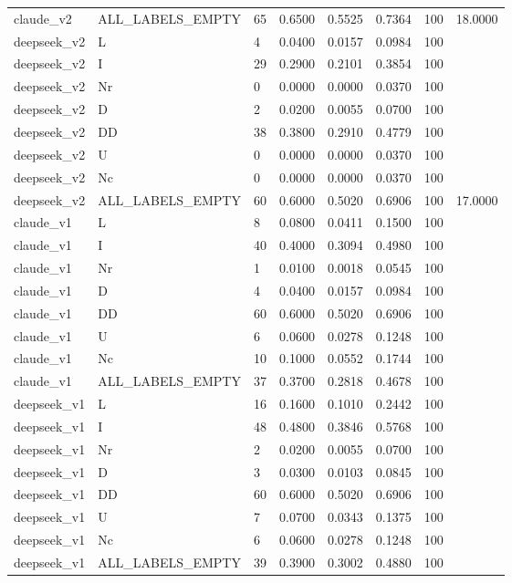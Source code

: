 \begin{table}[ht]
\begin{tabular}{llllllll}
claude\_v2 & ALL\_LABELS\_EMPTY & 65 & 0.6500 & 0.5525 & 0.7364 & 100 & 18.0000 \\
deepseek\_v2 & L & 4 & 0.0400 & 0.0157 & 0.0984 & 100 &  \\
deepseek\_v2 & I & 29 & 0.2900 & 0.2101 & 0.3854 & 100 &  \\
deepseek\_v2 & Nr & 0 & 0.0000 & 0.0000 & 0.0370 & 100 &  \\
deepseek\_v2 & D & 2 & 0.0200 & 0.0055 & 0.0700 & 100 &  \\
deepseek\_v2 & DD & 38 & 0.3800 & 0.2910 & 0.4779 & 100 &  \\
deepseek\_v2 & U & 0 & 0.0000 & 0.0000 & 0.0370 & 100 &  \\
deepseek\_v2 & Nc & 0 & 0.0000 & 0.0000 & 0.0370 & 100 &  \\
deepseek\_v2 & ALL\_LABELS\_EMPTY & 60 & 0.6000 & 0.5020 & 0.6906 & 100 & 17.0000 \\
claude\_v1 & L & 8 & 0.0800 & 0.0411 & 0.1500 & 100 &  \\
claude\_v1 & I & 40 & 0.4000 & 0.3094 & 0.4980 & 100 &  \\
claude\_v1 & Nr & 1 & 0.0100 & 0.0018 & 0.0545 & 100 &  \\
claude\_v1 & D & 4 & 0.0400 & 0.0157 & 0.0984 & 100 &  \\
claude\_v1 & DD & 60 & 0.6000 & 0.5020 & 0.6906 & 100 &  \\
claude\_v1 & U & 6 & 0.0600 & 0.0278 & 0.1248 & 100 &  \\
claude\_v1 & Nc & 10 & 0.1000 & 0.0552 & 0.1744 & 100 &  \\
claude\_v1 & ALL\_LABELS\_EMPTY & 37 & 0.3700 & 0.2818 & 0.4678 & 100 &  \\
deepseek\_v1 & L & 16 & 0.1600 & 0.1010 & 0.2442 & 100 &  \\
deepseek\_v1 & I & 48 & 0.4800 & 0.3846 & 0.5768 & 100 &  \\
deepseek\_v1 & Nr & 2 & 0.0200 & 0.0055 & 0.0700 & 100 &  \\
deepseek\_v1 & D & 3 & 0.0300 & 0.0103 & 0.0845 & 100 &  \\
deepseek\_v1 & DD & 60 & 0.6000 & 0.5020 & 0.6906 & 100 &  \\
deepseek\_v1 & U & 7 & 0.0700 & 0.0343 & 0.1375 & 100 &  \\
deepseek\_v1 & Nc & 6 & 0.0600 & 0.0278 & 0.1248 & 100 &  \\
deepseek\_v1 & ALL\_LABELS\_EMPTY & 39 & 0.3900 & 0.3002 & 0.4880 & 100 &  \\
\bottomrule
\end{tabular}
\end{table}
